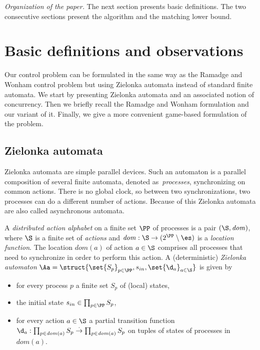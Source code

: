 \documentclass{llncs}
\newcommand{\loc}{\mathit{dom}}
\begin{document}
\medskip

 \noindent\textit{Organization of the paper.} 
 The next section presents basic definitions. 
 The two consecutive sections present the algorithm and the matching
 lower bound. 




\section{Basic definitions and observations}
Our control problem can be formulated in the same way as the Ramadge
and Wonham control problem but using Zielonka automata instead of
standard finite automata. We start by presenting Zielonka automata and
an associated notion of concurrency. Then we briefly recall the
Ramadge and Wonham formulation and our variant of it. Finally, we give
a more convenient game-based formulation of the problem.


\subsection{Zielonka automata}

Zielonka automata are simple parallel devices. Such an
automaton is a parallel
composition of several finite automata, denoted as~\emph{processes},
synchronizing on common actions. There is no global clock, so between
two synchronizations, two processes can do a different number of
actions. Because of this Zielonka automata are also called
asynchronous automata.

A \emph{distributed action alphabet} on a finite set $\PP$ of processes is a
pair $(\S,\loc)$, where $\S$ is a finite set of \emph{actions} and
$\loc:\S \to (2^{\PP}\setminus \es)$ is a \emph{location
  function}. The location $\loc(a)$ of action $a \in\S$ comprises all
processes  that need to synchronize in order to perform this
action. 
A (deterministic) \emph{Zielonka automaton}
$\Aa=\struct{\set{S_p}_{p\in \PP},s_{in},\set{\d_a}_{a\in\S}}$ is
given by 
\begin{itemize}
\item for every process $p$ a finite set $S_p$ of (local) states,
\item the initial state $s_{in} \in \prod_{p \in \PP} S_p$, 
\item for every action $a \in\S$  a partial transition function
$\d_a:\prod_{p\in \loc(a)}S_p\stackrel{\cdot}{\to} \prod_{p\in \loc(a)}S_p$ on tuples of states of processes in
  $\loc(a)$. 
\end{itemize}
\end{document}
